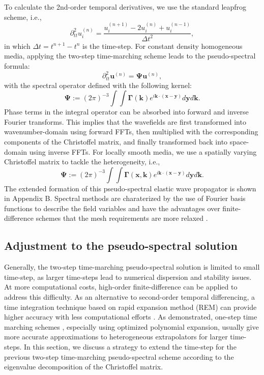 To calculate the 2nd-order temporal derivatives, we use the standard leapfrog scheme,
i.e.,
\begin{equation}
\label{eq:leapfrog}
\partial^2_{tt}{u^{(n)}_{i}} = \frac{u^{(n+1)}_i - 2u^{(n)}_i +u^{(n-1)}_i}{\Delta{t^2}},
\end{equation}
in which $\Delta{t}=t^{n+1}-t^n$ is the time-step.
For constant density homogeneous media, applying the two-step time-marching scheme
leads to the pseudo-spectral formula:
\begin{equation}
\label{eq:ps}
\partial^2_{tt}{\mathbf{u}^{(n)}} = \mathbf{\Psi} \mathbf{u}^{(n)},
\end{equation}
with the spectral operator defined with the following kernel:
\begin{equation}
\label{eq:spect}
\mathbf{\Psi}:=
(2\pi)^{-3}\int{\int{\mathbf{\Gamma}(\mathbf{k})e^{i\mathbf{k}\cdot(\mathbf{x}-\mathbf{y})}d\mathbf{y}d\mathbf{k}}}.
\end{equation}
Phase terms in the integral operator can be absorbed into forward and inverse Fourier transforms.
This implies that the wavefields are first transformed into
wavenumber-domain using forward FFTs,
then multiplied with the corresponding components of the Christoffel matrix, and finally
transformed back into space-domain using inverse FFTs.
For locally smooth media, we use a spatially varying Christoffel matrix to
tackle the heterogeneity, i.e.,
\begin{equation}
\label{eq:spectx}
\mathbf{\Psi}:=
(2\pi)^{-3}\int{\int{\mathbf{\Gamma}(\mathbf{x},\mathbf{k})e^{i\mathbf{k}\cdot(\mathbf{x}-\mathbf{y})}d\mathbf{y}d\mathbf{k}}}.
\end{equation}
The extended formation of this pseudo-spectral elastic wave propagator is shown in Appendix B.
Spectral methods are charaterized by the use of Fourier basis functions to describe the field variables and 
have the advantages over finite-difference schemes that the mesh requirements are more relaxed \cite[]{kosloff:1989,liu.li:2000}.

\subsection{Adjustment to the pseudo-spectral solution}

Generally, the two-step time-marching pseudo-spectral solution is limited to  small time-step,
as larger time-steps lead to numerical dispersion and stability issues.
At more computational costs, high-order finite-difference \cite[]{dablain:1986}
can be applied to address this difficulty.
As an alternative to second-order temporal differencing, a time integration technique based on 
rapid expansion method (REM) can provide higher accuracy with less computational efforts
\cite[]{kosloff:1989}.
As \cite{du:2014} demonstrated, one-step time marching schemes \cite[]{zhang.zhang:2009,sun.fomel:2013},
especially using optimized polynomial expansion, usually give more accurate
approximations to heterogeneous extrapolators for larger time-steps.
In this section, we discuss a strategy to extend the time-step for the previous two-step time-marching
pseudo-spectral scheme
according to the eigenvalue decomposition of the Christoffel matrix.

